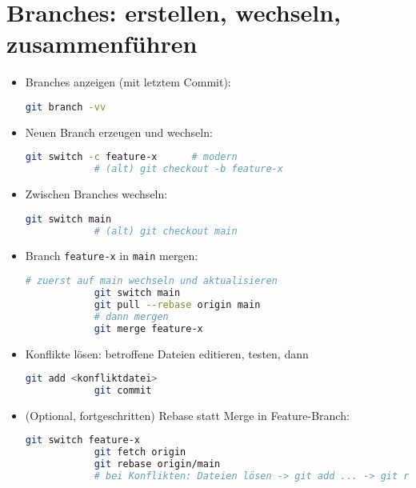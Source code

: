 \documentclass[a4paper,11pt]{article}
\begin{document}
	\section{Branches: erstellen, wechseln, zusammenf\"uhren}
	\begin{itemize}
		\item Branches anzeigen (mit letztem Commit):
		\begin{lstlisting}[language=bash]
			git branch -vv
		\end{lstlisting}
		\item Neuen Branch erzeugen und wechseln:
		\begin{lstlisting}[language=bash]
			git switch -c feature-x      # modern
			# (alt) git checkout -b feature-x
		\end{lstlisting}
		\item Zwischen Branches wechseln:
		\begin{lstlisting}[language=bash]
			git switch main
			# (alt) git checkout main
		\end{lstlisting}
		\item Branch \texttt{feature-x} in \texttt{main} mergen:
		\begin{lstlisting}[language=bash]
			# zuerst auf main wechseln und aktualisieren
			git switch main
			git pull --rebase origin main
			# dann mergen
			git merge feature-x
		\end{lstlisting}
		\item Konflikte l\"osen: betroffene Dateien editieren, testen, dann
		\begin{lstlisting}[language=bash]
			git add <konfliktdatei>
			git commit
		\end{lstlisting}
		\item (Optional, fortgeschritten) Rebase statt Merge in Feature-Branch:
		\begin{lstlisting}[language=bash]
			git switch feature-x
			git fetch origin
			git rebase origin/main
			# bei Konflikten: Dateien lösen -> git add ... -> git rebase --continue
		\end{lstlisting}
	\end{itemize}
	
\end{document}
